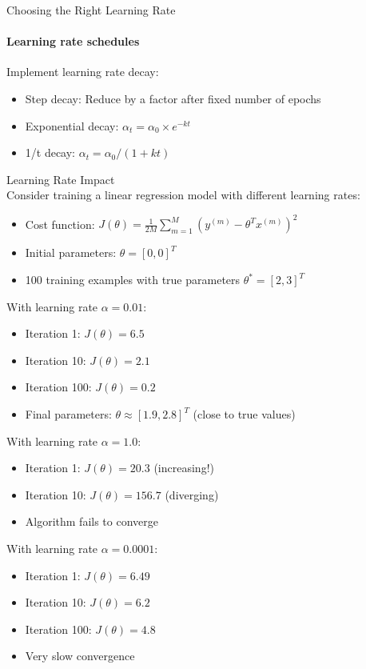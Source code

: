 \begin{KR}{Choosing the Right Learning Rate}
\paragraph{Learning rate schedules}
Implement learning rate decay:
\begin{itemize}
    \item Step decay: Reduce by a factor after fixed number of epochs
    \item Exponential decay: $\alpha_t = \alpha_0 \times e^{-kt}$
    \item 1/t decay: $\alpha_t = \alpha_0 / (1 + kt)$
\end{itemize}
\end{KR}

\begin{example2}{Learning Rate Impact}\\
Consider training a linear regression model with different learning rates:
\begin{itemize}
    \item Cost function: $J(\theta) = \frac{1}{2M}\sum_{m=1}^{M}(y^{(m)} - \theta^T x^{(m)})^2$
    \item Initial parameters: $\theta = [0, 0]^T$
    \item 100 training examples with true parameters $\theta^* = [2, 3]^T$
\end{itemize}
\tcblower
With learning rate $\alpha = 0.01$:
\begin{itemize}
    \item Iteration 1: $J(\theta) = 6.5$
    \item Iteration 10: $J(\theta) = 2.1$
    \item Iteration 100: $J(\theta) = 0.2$
    \item Final parameters: $\theta \approx [1.9, 2.8]^T$ (close to true values)
\end{itemize}

With learning rate $\alpha = 1.0$:
\begin{itemize}
    \item Iteration 1: $J(\theta) = 20.3$ (increasing!)
    \item Iteration 10: $J(\theta) = 156.7$ (diverging)
    \item Algorithm fails to converge
\end{itemize}

With learning rate $\alpha = 0.0001$:
\begin{itemize}
    \item Iteration 1: $J(\theta) = 6.49$
    \item Iteration 10: $J(\theta) = 6.2$
    \item Iteration 100: $J(\theta) = 4.8$
    \item Very slow convergence
\end{itemize}
\end{example2}

